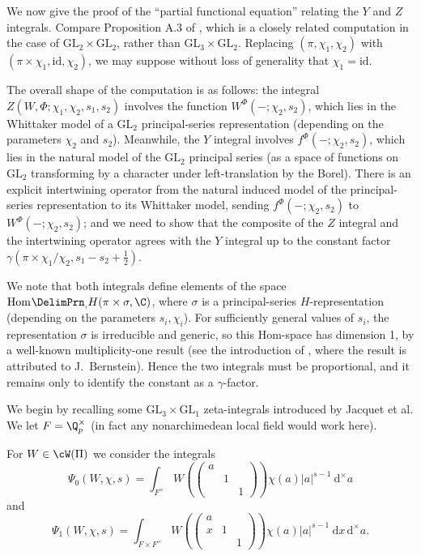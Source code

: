 \documentclass[10pt,reqno,a4paper]{amsart}
\newcommand{\sdthree}[3]{\left(\begin{smallmatrix}#1 \\ & #2\\ && #3\end{smallmatrix}\right)}
\newcommand{\GL}{\mathrm{GL}}
\newcommand{\smallthreemat}[9]{\left(\begin{smallmatrix}
#1 & #2 & #3 \\
#4 & #5 & #6 \\
#7 & #8 & #9\end{smallmatrix}\right)}
\begin{document}
 We now give the proof of the ``partial functional equation'' relating the $Y$ and $Z$ integrals. Compare Proposition A.3 of \cite{LZ-distinguished}, which is a closely related computation in the case of $\GL_2 \times \GL_2$, rather than $\GL_3 \times \GL_2$. Replacing $(\pi, \chi_1, \chi_2)$ with $(\pi \times \chi_1, \mathrm{id}, \chi_2)$, we may suppose without loss of generality that $\chi_1 = \mathrm{id}$.

\begin{remark}
The overall shape of the computation is as follows: the integral $Z(W, \Phi; \chi_1, \chi_2, s_1, s_2)$ involves the function $W^{\Phi}(-; \chi_2, s_2)$, which lies in the Whittaker model of a $\GL_2$ principal-series representation (depending on the parameters $\chi_2$ and $s_2$). Meanwhile, the $Y$ integral involves $f^{\Phi}(-; \chi_2, s_2)$, which lies in the natural model of the $\GL_2$ principal series (as a space of functions on $\GL_2$ transforming by a character under left-translation by the Borel). There is an explicit intertwining operator from the natural induced model of the principal-series representation to its Whittaker model, sending $f^{\Phi}(-; \chi_2, s_2)$ to $W^{\Phi}(-; \chi_2, s_2)$; and we need to show that the composite of the $Z$ integral and the intertwining operator agrees with the $Y$ integral up to the constant factor $\gamma(\pi \times \chi_1/\chi_2, s_1 - s_2 + \tfrac{1}{2})$. 

We note that both integrals define elements of the space $\Hom_H(\pi \times \sigma, \C)$, where $\sigma$ is a principal-series $H$-representation (depending on the parameters $s_i, \chi_i$). For sufficiently general values of $s_i$, the representation $\sigma$ is irreducible and generic, so this Hom-space has dimension 1, by a well-known multiplicity-one result (see the introduction of \cite{prasad93}, where the result is attributed to J.~Bernstein). Hence the two integrals must be proportional, and it remains only to identify the constant as a $\gamma$-factor. 
\end{remark}

We begin by recalling some $\GL_3 \times \GL_1$ zeta-integrals introduced by Jacquet et al. We let $F = \Q_p^\times$ (in fact any nonarchimedean local field would work here).

\begin{definition}
For $W \in \cW(\Pi)$ we consider the integrals
\[ \Psi_0(W, \chi, s) = \int_{F^\times} W\left(\sdthree{a}{1}{1}\right) \chi(a) |a|^{s-1}\ \mathrm{d}^\times\!a\]
and
\[ \Psi_1(W, \chi, s) = \int_{F \times F^\times} W\left(\smallthreemat{a}{}{}{x}{1}{}{}{}{1}\right) \chi(a) |a|^{s-1} \ \mathrm{d}x\, \mathrm{d}^\times\!a.\]
\end{definition}
\end{document}
